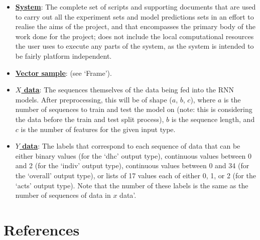 \documentclass[12pt,twoside]{report}
\begin{document}
\begin{itemize}
	\item \underline{\textbf{System}}: The complete set of scripts and supporting documents that are used to carry out all the experiment sets and model predictions sets in an effort to realise the aims of the project, and that encompasses the primary body of the work done for the project; does not include the local computational resources the user uses to execute any parts of the system, as the system is intended to be fairly platform independent.
	\item \underline{\textbf{Vector sample}}: (see ‘Frame’).
	\item \underline{\textbf{$X$ data}}: The sequences themselves of the data being fed into the RNN models. After preprocessing, this will be of shape ($a$, $b$, $c$), where $a$ is the number of sequences to train and test the model on (note: this is considering the data before the train and test split process), $b$ is the sequence length, and $c$ is the number of features for the given input type.
	\item \underline{\textbf{$Y$ data}}: The labels that correspond to each sequence of data that can be either binary values (for the ‘dhc’ output type), continuous values between 0 and 2 (for the ‘indiv’ output type), continuous values between 0 and 34 (for the ‘overall’ output type), or lists of 17 values each of either 0, 1, or 2 (for the ‘acts’ output type). Note that the number of these labels is the same as the number of sequences of data in $x$ data’.
\end{itemize}







\chapter{References\\~\\}
\end{document}
